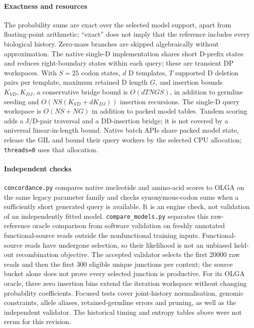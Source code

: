 \documentclass[11pt]{article}
\theoremstyle{oldplain}
\theoremstyle{oldrem}
\begin{document}
\paragraph{Exactness and resources} The probability sums are exact over the selected
model support, apart from floating-point arithmetic; ``exact'' does not imply that
the reference includes every biological history.
Zero-mass branches are skipped algebraically without approximation.
The native single-D implementation shares short D-prefix states and reduces
right-boundary states within each query; these are transient DP workspaces.
With $S=25$ codon states, $d$ D templates, $T$ supported D deletion pairs per
template, maximum retained D length $G$, and insertion bounds $K_{VD},K_{DJ}$,
a conservative bridge bound is $O(dTNGS)$, in addition to germline seeding and
$O(NS(K_{VD}+dK_{DJ}))$ insertion recursions.
The single-D query workspace is $O(NS+NG)$ in addition to packed model tables.
Tandem scoring adds a J/D-pair traversal and a DD-insertion bridge; it is not
covered by a universal linear-in-length bound.
Native batch APIs share packed model state, release the GIL and bound their
query workers by the selected CPU allocation; \texttt{threads=0} uses that allocation.

\paragraph{Independent checks} \texttt{concordance.py} compares native nucleotide
and amino-acid scores to OLGA on the same legacy parameter family and checks
synonymous-codon sums when a sufficiently short generated query is available.
It is an engine check, not validation of an independently fitted model.
\texttt{compare\_models.py} separates this raw-reference oracle comparison from
software validation on freshly annotated functional-source reads outside the
nonfunctional training inputs.
Functional-source reads have undergone selection, so their likelihood is not an
unbiased held-out recombination objective.
The accepted validator selects the first 20000 raw reads and then the first
300 eligible unique junctions per context; the source bucket alone does not
prove every selected junction is productive.
For its OLGA oracle, three zero insertion bins extend the iteration workspace
without changing probability coefficients.
Focused tests cover joint-history normalisation, genomic constraints, allele
aliases, retained-germline errors and pruning, as well as the independent validator.
The historical timing and entropy tables above were not rerun for this revision.
\end{document}

